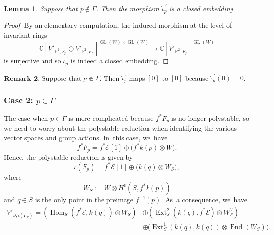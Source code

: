 \documentclass[11pt]{article}
\newcommand{\CC}{{\mathbb C}}\let\C\CC
\newcommand{\PP}{{\mathbb P}}\let\P\PP
\newcommand\cE{\mathcal{E}}
\DeclareMathOperator{\End}{End}
\DeclareMathOperator{\Ext}{Ext}
\DeclareMathOperator{\GL}{GL}
\DeclareMathOperator{\Hom}{Hom}
\newtheorem{lemm}{Lemma}[section]
\theoremstyle{definition}
\newtheorem{rema}[lemm]{Remark}
\begin{document}
\begin{lemm}\label{lem:PointIsNotInGamma}
Suppose that $p\notin \mathsf{\Gamma}$.
Then the morphism $\widehat{\iota}_p^{\ \prime}$ is a closed embedding.
\end{lemm}

\begin{proof}
By an elementary computation, the induced morphism at the level of invariant rings
\[
\CC[V'_{\PP^2,F_p}\oplus V'_{\PP^2,F_p}]^{\GL(W) \times \GL(W)} \to \CC[V'_{\PP^2,F_p}]^{\GL(W)}
\]
is surjective and so $\widehat{\iota}_p^{\ \prime}$ is indeed a closed embedding.
\end{proof}

\begin{rema}\label{rmk:0Case1}
Suppose that $p\notin \mathsf{\Gamma}$.
Then $\widehat{\iota}_p^{\ \prime}$ maps $[0]$ to $[0]$ because $\widetilde{\iota}_p^{\ \prime}(0)=0$.
\end{rema}

\subsubsection*{Case 2: $p\in\mathsf{\Gamma}$} The case when $p\in\mathsf{\Gamma}$ is more complicated because $f^*F_p$ is no longer polystable, so we need to worry about the polystable reduction when identifying the various vector spaces and group actions. In~this case, we~have
\[
f^*F_p = f^*\cE[1] \oplus \bigl(f^*k(p) \otimes W\bigr).
\]
Hence, the polystable reduction is given by
\[
\overline{\iota}(F_p) = f^*\cE[1] \oplus \bigl(k(q) \otimes W_S\bigr),
\]
where
\begin{equation*}\label{eq:WS}
W_S:=W\otimes H^0(S,f^*k(p))
\end{equation*}
and $q\in S$ is the only point in the preimage $f^{-1}(p)$. As~a consequence, we~have
\begin{equation}\label{eq:VSprime}
\begin{split}
V'_{S,\overline{\iota}(F_p)} = \left(\Hom_{S}(f^*\cE,k(q))\otimes W_S\right) &\oplus \left(\Ext^2_{S}(k(q),f^*\cE)\otimes W_S^\vee\right)\\
&\oplus \bigl(\Ext^1_{S}(k(q),k(q))\otimes \End(W_S)\bigr).
\end{split}
\end{equation}
\end{document}
